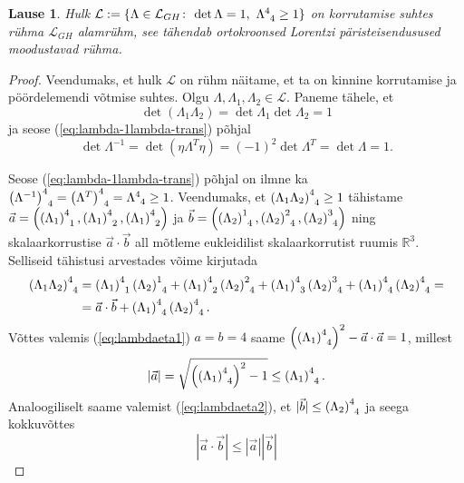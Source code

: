 \documentclass[12pt,a4paper,oneside]{article}
\theoremstyle{plain}
\newtheorem{lause}{Lause}[section]
\theoremstyle{definition}
\numberwithin{equation}{section}
\def\R{{\mathbb R}}
\def\L{{\mathcal L}}
\begin{document}
\begin{lause} \label{lause:ryhmL}
Hulk $\L := \{\Lambda \in \L_{GH} \colon\, \det \Lambda = 1,\ 
\Lambda\indices{^4_4} \geq 1\}$ on korrutamise suhtes rühma 
$\L_{GH}$ alamrühm, see tähendab ortokroonsed Lorentzi 
päristeisendusused moodustavad rühma.
\end{lause}
\begin{proof}
Veendumaks, et hulk $\L$ on rühm näitame, et ta on kinnine 
kor\-rutamise ja pöördelemendi võtmise suhtes. Olgu 
$\Lambda, \Lambda_1, \Lambda_2 \in \L$.
Paneme tähele, et 
\[\det \left(\Lambda_1 \Lambda_2 \right) = 
\det \Lambda_1 \det \Lambda_2 = 1\] ja seose 
(\ref{eq:lambda-1lambda-trans}) põhjal \[\det \Lambda^{-1} = 
\det \left(\eta \Lambda^T \eta\right) = (-1)^2 \det \Lambda^T = 
\det \Lambda = 1.\]

Seose (\ref{eq:lambda-1lambda-trans}) põhjal on ilmne ka 
$\left(\Lambda^{-1}\right)\indices{^4_4} = 
\left(\Lambda^T\right)\indices{^4_4} = 
\Lambda\indices{^4_4} \geq 1$.
Veendumaks, et $\left(\Lambda_1 \Lambda_2\right)\indices{^4_4} \geq 
1$ tähistame 
$\vec{a} = \left(\left(\Lambda_1\right)\indices{^4_1}, 
\left(\Lambda_1\right)\indices{^4_2}, 
\left(\Lambda_1\right)\indices{^4_2}\right)$ 
ja $\vec{b} = \left(\left(\Lambda_2\right)\indices{^1_4}, 
\left(\Lambda_2\right)\indices{^2_4}, 
\left(\Lambda_2\right)\indices{^3_4}\right)$ 
ning skalaarkorrustise 
$\vec{a} \cdot \vec{b}$ all mõtleme eukleidilist skalaarkorrutist 
ruumis $\R^3$. Selliseid tähistusi arvestades võime kirjutada
\begin{align*}
\left(\Lambda_1 \Lambda_2\right)\indices{^4_4} &= 
	\left(\Lambda_1\right)\indices{^4_1}
	\left(\Lambda_2\right)\indices{^1_4} + 
	\left(\Lambda_1\right)\indices{^4_2}
	\left(\Lambda_2\right)\indices{^2_4} + 
	\left(\Lambda_1\right)\indices{^4_3}
	\left(\Lambda_2\right)\indices{^3_4} + 
	\left(\Lambda_1\right)\indices{^4_4}
	\left(\Lambda_2\right)\indices{^4_4} = \\
&= \vec{a} \cdot \vec{b} + 
	\left(\Lambda_1\right)\indices{^4_4}
	\left(\Lambda_2\right)\indices{^4_4}.
\end{align*}
Võttes valemis (\ref{eq:lambdaeta1}) $a = b = 4$ saame 
$\left(\left(\Lambda_1\right)\indices{^4_4}\right)^2 - 
\vec{a}\cdot\vec{a} = 1$, millest \[|\vec{a}| = 
\sqrt{\left(\left(\Lambda_1\right)\indices{^4_4}\right)^2 - 1} \leq 
\left(\Lambda_1\right)\indices{^4_4}.\]
Analoogiliselt saame valemist (\ref{eq:lambdaeta2}), et 
$|\vec{b}| \leq \left(\Lambda_2\right)\indices{^4_4}$ 
ja seega kokkuvõttes 
\[|\vec{a}\cdot\vec{b}| \leq |\vec{a}||\vec{b}| 
\]
\end{proof}
\end{document}
